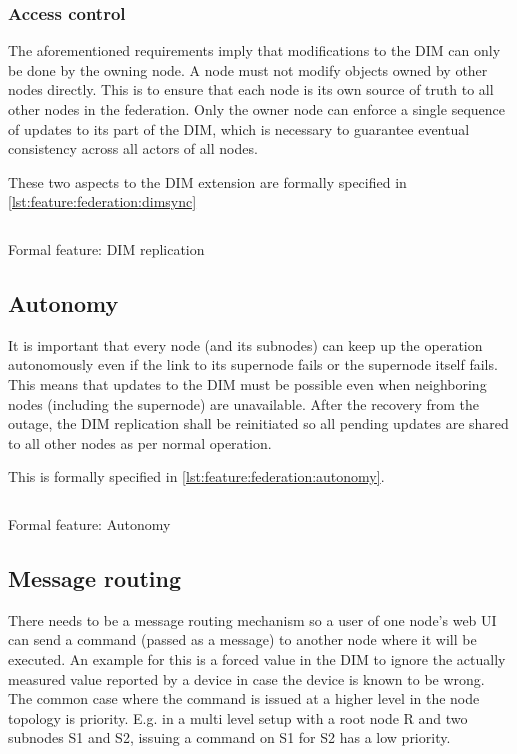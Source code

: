 \subsubsection{Access control}
The aforementioned requirements imply that modifications to the \gls{DIM} can only be done by the
owning node. A node
must not modify objects owned by other nodes directly. This is to ensure that each node is its own source of truth
to all other nodes in the federation. Only the owner node can enforce a single
sequence of updates to its part of the DIM, which is necessary to guarantee
eventual consistency \cite[Chapter 5, Reliable Pub-Sub (Clone Pattern), Republishing
Updates from Clients]{zmq:zguide} across all actors of all nodes.

These two aspects to the DIM extension are formally specified in \autoref{lst:feature:federation:dimsync}

\begin{listing}
	\inputminted{Gherkin}{listings/features/federation/dim_extension.feature}
	\caption{Formal feature: DIM replication}
	\label{lst:feature:federation:dimsync}
\end{listing}

\subsection{Autonomy}
It is important that every node (and its subnodes) can keep up the operation autonomously even if the
link to its supernode fails or the supernode itself fails. This means that updates to
the \gls{DIM} must be possible even when neighboring nodes (including the supernode) are unavailable. After the
recovery from the outage, the \gls{DIM} replication shall be reinitiated so
all pending updates are shared to all other nodes as per normal operation.

This is formally specified in \autoref{lst:feature:federation:autonomy}.

\begin{listing}
	\inputminted{Gherkin}{listings/features/federation/autonomy.feature}
	\caption{Formal feature: Autonomy}
	\label{lst:feature:federation:autonomy}
\end{listing}

\subsection{Message routing}
There needs to be a message routing mechanism so a user
of one node's web UI can send a command (passed as a message) to another node where it will be
executed. An example for this is a forced value in the DIM to ignore the
actually measured value reported by a device in case the device is known to be
wrong. The common case where the command is issued at a higher level in the node
topology is priority. E.g. in a multi level setup with a root node R and two
subnodes S1 and S2, issuing a command on S1 for S2 has a low priority.

